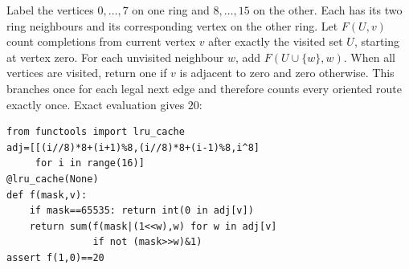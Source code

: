 Label the vertices $0,\ldots,7$ on one ring and $8,\ldots,15$ on the other. Each has its two ring neighbours and its corresponding vertex on the other ring. Let $F(U,v)$ count completions from current vertex $v$ after exactly the visited set $U$, starting at vertex zero. For each unvisited neighbour $w$, add $F(U\cup\{w\},w)$. When all vertices are visited, return one if $v$ is adjacent to zero and zero otherwise. This branches once for each legal next edge and therefore counts every oriented route exactly once. Exact evaluation gives $\boxed{20}$:
\begin{verbatim}
from functools import lru_cache
adj=[[(i//8)*8+(i+1)%8,(i//8)*8+(i-1)%8,i^8]
     for i in range(16)]
@lru_cache(None)
def f(mask,v):
    if mask==65535: return int(0 in adj[v])
    return sum(f(mask|(1<<w),w) for w in adj[v]
               if not (mask>>w)&1)
assert f(1,0)==20
\end{verbatim}
